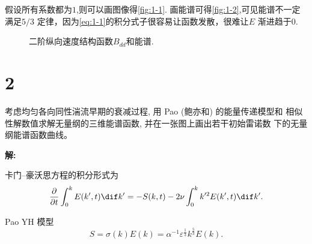 \documentclass[12pt,a4]{ctexart}
\begin{document}
假设所有系数都为$1$,则可以画图像得\cref{fig:1-1}.
画能谱可得\cref{fig:1-2},可见能谱不一定满足$5 / 3$ 定律，因为\cref{eq:1-1}的积分式子很容易让函数发散，很难让$E$ 渐进趋于$0$.
\begin{figure}[htpb]
   \centering
   \quad
   \quad
   \caption{二阶纵向速度结构函数$B_{d d}$和能谱.}
\end{figure}



\section{2}

考虑均匀各向同性湍流早期的衰减过程, 用 Pao (鲍亦和) 的能量传递模型和 相似性解数值求解无量纲的三维能谱函数, 并在一张图上画出若干初始雷诺数 下的无量纲能谱函数曲线。

\textsf{\hspace{-2em}\sf  \textbf{解:}}

卡门--豪沃思方程的积分形式为
\begin{equation}
   \frac{\partial }{\partial t}  \int_{0}^{k} E(k',t)\dif k' = -S(k,t) - 2\nu \int_{0}^{k} k'^2E(k',t)\dif k'.
   \label{eq:2_1}
\end{equation}

Pao YH 模型 \cite{PaoYH}
\begin{equation}
   S=\sigma(k) E(k)=\alpha^{-1} \varepsilon^{\frac{1}{3}} k^{\frac{5}{3}} E(k).
\end{equation}
\end{document}

